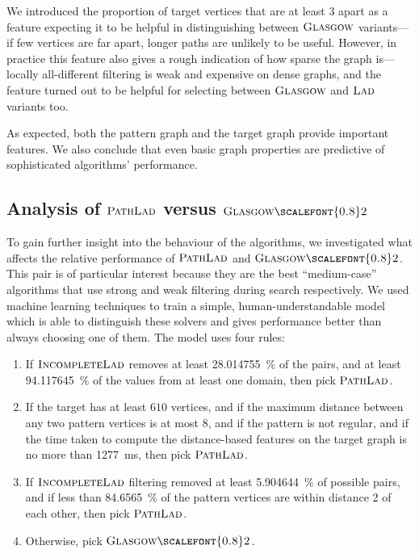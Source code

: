 \documentclass{llncs}
\newcommand{\Glasgow}{$\textsc{Glasgow}$\xspace}
\newcommand{\LAD}{$\textsc{Lad}$\xspace}
\newcommand{\IncompleteLAD}{$\textsc{IncompleteLad}$\xspace}
\newcommand{\PathLAD}{$\textsc{PathLad}$\xspace}
\newcommand{\GlasgowTwo}{$\textsc{Glasgow{\scalefont{0.8}2}}$\xspace}
\begin{document}
We introduced the proportion of target vertices that are at least 3 apart as a
feature expecting it to be helpful in distinguishing between
\Glasgow variants---if few vertices are far apart, longer paths are unlikely to
be useful. However, in practice this feature also gives a rough indication of
how sparse the graph is---locally all-different filtering is weak and expensive
on dense graphs, and the feature turned out to be helpful for selecting between
\Glasgow and \LAD variants too.

As expected, both the pattern graph and the target graph provide important
features. We also conclude that even basic graph properties are predictive of
sophisticated algorithms' performance.

\subsection{Analysis of \PathLAD versus \GlasgowTwo}

To gain further insight into the behaviour of the algorithms, we
investigated what affects the relative performance of \PathLAD and \GlasgowTwo.
This pair is of particular interest because they are the best ``medium-case''
algorithms that use strong and weak filtering during search respectively. We
used machine learning techniques to train a simple, human-understandable model
which is able to distinguish these solvers and gives performance better than
always choosing one of them. The model uses four rules:

\begin{enumerate}
    \item If \IncompleteLAD removes at least \SI{28.014755}{\percent} of the pairs,
        and at least \SI{94.117645}{\percent} of the values from at least one domain,
        then pick \PathLAD.
    \item If the target has at least $610$ vertices, and if the maximum
        distance between any two pattern vertices is at most $8$, and if the
        pattern is not regular, and if the time taken to compute the
        distance-based features on the target graph is no more than
        \SI{1277}{\ms}, then pick \PathLAD.
    \item If \IncompleteLAD filtering removed at least \SI{5.904644}{\percent} of
        possible pairs, and if less than \SI{84.6565}{\percent} of the pattern
        vertices are within distance 2 of each other, then pick \PathLAD.
    \item Otherwise, pick \GlasgowTwo.
\end{enumerate}
\end{document}
